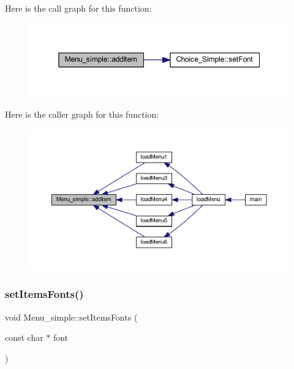 Here is the call graph for this function\+:\nopagebreak
\begin{figure}[H]
\begin{center}
\leavevmode
\includegraphics[width=350pt]{class_menu__simple_a0fc5b4ec10c844f34495364f70cd333e_cgraph}
\end{center}
\end{figure}
Here is the caller graph for this function\+:\nopagebreak
\begin{figure}[H]
\begin{center}
\leavevmode
\includegraphics[width=350pt]{class_menu__simple_a0fc5b4ec10c844f34495364f70cd333e_icgraph}
\end{center}
\end{figure}
\mbox{\label{class_menu__simple_a1273e6743ee892cd8651968efd595b73}} 
\subsubsection{\texorpdfstring{set\+Items\+Fonts()}{setItemsFonts()}}
{\footnotesize\ttfamily void Menu\+\_\+simple\+::set\+Items\+Fonts (\begin{DoxyParamCaption}\item[{const char $\ast$}]{font }\end{DoxyParamCaption})\hspace{0.3cm}{\ttfamily [virtual]}}

